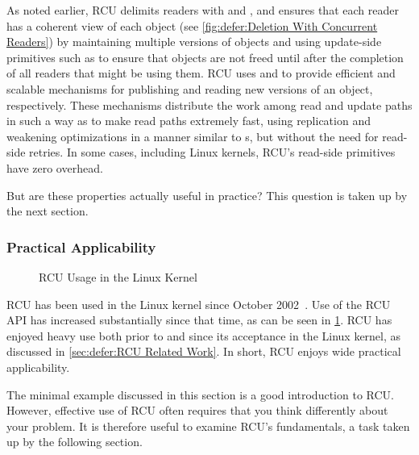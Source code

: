 As noted earlier, RCU delimits readers with  and
, and ensures that each reader has a coherent view
of each object (see \cref{fig:defer:Deletion With Concurrent Readers}) by
maintaining multiple versions of objects and using update-side primitives
such as  to ensure that objects are not
freed until after the completion of all readers that might be using them.
RCU uses  and  to provide
efficient and scalable mechanisms for publishing and reading new versions
of an object, respectively.
These mechanisms distribute the work among read and
update paths in such a way as to make read paths extremely fast, using
replication and weakening optimizations in a manner similar to
s, but without the need for read-side retries.
In some cases, including  Linux kernels,
RCU's read-side primitives have zero overhead.

But are these properties actually useful in practice?
This question is taken up by the next section.

\subsubsection{Practical Applicability}
\label{sec:defer:Practical Applicability}

\begin{figure}
\centering
{}
\caption{RCU Usage in the Linux Kernel}
\label{fig:defer:RCU Usage in the Linux Kernel}
\end{figure}

RCU has been used in the Linux kernel since
October 2002~\cite{Torvalds2.5.43}.
Use of the RCU API has increased substantially since that time,
as can be seen in
\cref{fig:defer:RCU Usage in the Linux Kernel}.
RCU has enjoyed heavy use both prior to and since its acceptance
in the Linux kernel, as discussed in
\cref{sec:defer:RCU Related Work}.
In short, RCU enjoys wide practical applicability.

The minimal example discussed in this section is a good introduction to RCU\@.
However, effective use of RCU often requires that you think differently
about your problem.
It is therefore useful to examine RCU's fundamentals, a task taken up
by the following section.
